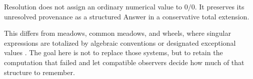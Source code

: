 \begin{resultbox}
Resolution does not assign an ordinary numerical value to $0/0$.  It preserves
its unresolved provenance as a structured Answer in a conservative total
extension.
\end{resultbox}

This differs from meadows, common meadows, and wheels, where singular
expressions are totalized by algebraic conventions or designated exceptional
values \cite{BergstraHirshfeldTucker2009,BergstraPonseCommonMeadows,Carlstrom2004}.
The goal here is not to replace those systems, but to retain the computation
that failed and let compatible observers decide how much of that structure to
remember.
